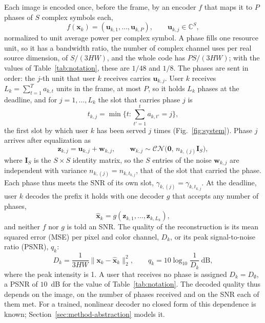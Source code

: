Each image is encoded once, before the frame, by an encoder $f$ that maps it to $P$ phases of $S$
complex symbols each,
\begin{equation}
f(\mathbf{x}_k) = (\mathbf{u}_{k,1}, \dots, \mathbf{u}_{k,P}), \qquad \mathbf{u}_{k,j} \in
\mathbb{C}^S,
\label{eq:encoder}
\end{equation}
normalized to unit average power per complex symbol. A phase fills one resource unit, so it has
a bandwidth ratio, the number of complex channel uses per real source dimension, of
$S / (3HW)$, and the whole code has $P S / (3HW)$; with the values of Table~\ref{tab:notation},
these are $1/48$ and $1/8$. The phases are sent in order: the $j$-th unit that user $k$ receives
carries $\mathbf{u}_{k,j}$. User $k$ receives $L_k = \sum_{t=1}^{T} a_{k,t}$ units in the frame,
at most $P$, so it holds $L_k$ phases at the deadline, and for $j = 1, \dots, L_k$ the slot that
carries phase $j$ is
\begin{equation}
t_{k,j} = \min \Big\{ t : \sum_{t' = 1}^{t} a_{k,t'} = j \Big\},
\label{eq:phase-slot}
\end{equation}
the first slot by which user $k$ has been served $j$ times (Fig.~\ref{fig:system}). Phase $j$
arrives after equalization as
\begin{equation}
\mathbf{z}_{k,j} = \mathbf{u}_{k,j} + \mathbf{w}_{k,j}, \qquad
\mathbf{w}_{k,j} \sim \mathcal{CN}\big(\mathbf{0},\, n_{k,(j)} \mathbf{I}_S\big),
\label{eq:phase-rx}
\end{equation}
where $\mathbf{I}_S$ is the $S \times S$ identity matrix, so the $S$ entries of the noise
$\mathbf{w}_{k,j}$ are independent with variance $n_{k,(j)} = n_{k, t_{k,j}}$, that of the slot
that carried the phase. Each phase thus meets the SNR of its own slot,
$\gamma_{k,(j)} = \gamma_{k, t_{k,j}}$. At the deadline, user $k$ decodes the prefix it holds with
one decoder $g$ that accepts any number of phases,
\begin{equation}
\hat{\mathbf{x}}_k = g(\mathbf{z}_{k,1}, \dots, \mathbf{z}_{k,L_k}),
\label{eq:decoder}
\end{equation}
and neither $f$ nor $g$ is told an SNR. The quality of the reconstruction is its mean squared
error (MSE) per pixel and color channel, $D_k$, or its peak signal-to-noise ratio (PSNR), $q_k$:
\begin{equation}
D_k = \frac{1}{3HW} \big\| \mathbf{x}_k - \hat{\mathbf{x}}_k \big\|_2^2, \qquad
q_k = 10 \log_{10} \frac{1}{D_k}~\text{dB},
\label{eq:psnr}
\end{equation}
where the peak intensity is 1. A user that receives no phase is assigned $D_k = D_\emptyset$,
a PSNR of $10$~dB for the value of Table~\ref{tab:notation}. The decoded quality thus depends on
the image, on the number of phases received and on the SNR each of them met. For a trained,
nonlinear decoder no closed form of this dependence is known;
Section~\ref{sec:method-abstraction} models it.

